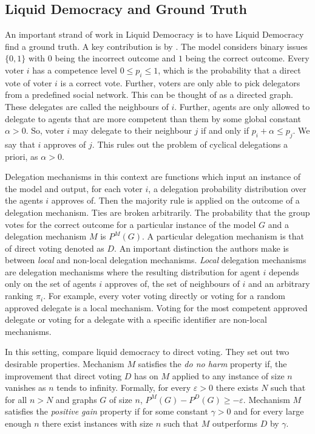 \documentclass[11pt,a4paper, titlepage]{article}
\theoremstyle{definition}
\begin{document}
\subsection{Liquid Democracy and Ground Truth}
An important strand of work in Liquid Democracy is to have Liquid Democracy find a ground truth. 
A key contribution is by \citet{kahng2021liquid}. 
The model considers binary issues $\{0, 1\}$ with $0$ being the incorrect outcome and $1$ being the correct outcome. Every voter $i$ has a competence level $0 \leq p_i \leq 1$, which is the probability that a direct vote of voter $i$ is a correct vote.
Further, voters are only able to pick delegators from a predefined social network. This can be thought of as a directed graph.
These delegates are called the neighbours of $i$.
Further, agents are only allowed to delegate to agents that are more competent than them by some global constant $\alpha >0$.
So, voter $i$ may delegate to their neighbour $j$ if and only if $p_i + \alpha \leq p_j$. 
We say that $i$ approves of $j$.
This rules out the problem of cyclical delegations a priori, as $\alpha > 0$.

Delegation mechanisms in this context are functions which input an instance of the model and output, for each voter $i$, a delegation probability distribution over the agents $i$ approves of.
Then the majority rule is applied on the outcome of a delegation mechanism. Ties are broken arbitrarily.
The probability that the group votes for the correct outcome for a particular instance of the model $G$ and a delegation mechanism $M$ is $P^M(G)$.
A particular delegation mechanism is that of direct voting denoted as $D$.
An important distinction the authors make is between \emph{local} and non-local delegation mechanisms. \emph{Local} delegation mechanisms are delegation mechanisms where the resulting distribution for agent $i$ depends only on the set of agents $i$ approves of, the set of neighbours of $i$ and an arbitrary ranking $\pi_i$.
For example, every voter voting directly or voting for a random approved delegate is a local mechanism. Voting for the most competent approved delegate or voting for a delegate with a specific identifier are non-local mechanisms.

In this setting, \citeauthor{kahng2021liquid} compare liquid democracy to direct voting. They set out two desirable properties.
Mechanism $M$ satisfies the \emph{do no harm} property if, the improvement that direct voting $D$ has on $M$ applied to any instance of size $n$ vanishes as $n$ tends to infinity.
Formally, for every $\varepsilon > 0$ there exists $N$ such that for all $n > N$ and graphs $G$ of size $n$, $P^M(G) - P^D(G) \geq - \varepsilon$.
Mechanism $M$ satisfies the \emph{positive gain} property if for some constant $\gamma > 0$ and for every large enough $n$ there exist instances with size $n$ such that $M$ outperforms $D$ by $\gamma$.
\end{document}
